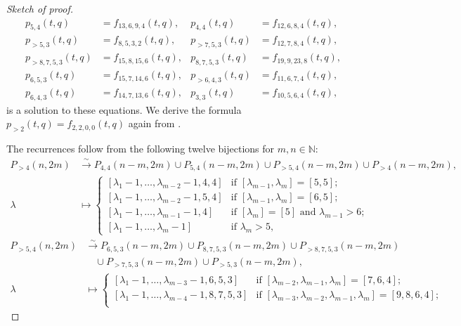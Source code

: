 \documentclass[a4paper, 12pt, reqno]{amsart}
\theoremstyle{remark}
\begin{document}
\begin{proof}[Sketch of proof]
\begin{align*}
    p_{5, 4}(t, q) &= f_{13, 6, 9, 4}(t, q), &p_{4, 4}(t, q) &= f_{12, 6, 8, 4}(t, q), \\
    p_{>5, 3}(t, q) &= f_{8, 5, 3, 2}(t, q), &p_{>7, 5, 3}(t, q) &= f_{12, 7, 8, 4}(t, q), \\
    p_{>8, 7, 5, 3}(t, q) &= f_{15, 8, 15, 6}(t, q), &p_{8, 7, 5, 3}(t, q) &= f_{19, 9, 23, 8}(t, q), \\
    p_{6, 5, 3}(t, q) &= f_{15, 7, 14, 6}(t, q), &p_{>6, 4, 3}(t, q) &= f_{11, 6, 7, 4}(t, q), \\
    p_{6, 4, 3}(t, q) &= f_{14, 7, 13, 6}(t, q), &p_{3, 3}(t, q) &= f_{10, 5, 6, 4}(t, q),
  \end{align*}
  is a solution to these equations.
  We derive the formula $p_{>2}(t, q) = f_{2, 2, 0, 0}(t, q)$ again from .

  The recurrences follow from the following twelve bijections for $m, n \in \mathbb{N}$:
  \begin{align*}
    P_{>4}(n, 2m) &\xrightarrow{\sim} P_{4, 4}(n - m, 2m) \cup P_{5, 4}(n - m, 2m) \cup P_{>5, 4}(n - m, 2m) \cup P_{>4}(n - m, 2m), \\
    \lambda &\mapsto
              \begin{cases}
                [\lambda_1 - 1, \dots, \lambda_{m - 2} - 1, 4, 4] &\text{if $[\lambda_{m - 1}, \lambda_m] = [5, 5]$}; \\
                [\lambda_1 - 1, \dots, \lambda_{m - 2} - 1, 5, 4] &\text{if $[\lambda_{m - 1}, \lambda_m] = [6, 5]$}; \\
                [\lambda_1 - 1, \dots, \lambda_{m - 1} - 1, 4] &\text{if $[\lambda_m] = [5]$ and $\lambda_{m - 1} > 6$}; \\
                [\lambda_1 - 1, \dots, \lambda_m - 1] &\text{if $\lambda_m > 5$},
              \end{cases}
  \end{align*}
  \begin{align*}
    P_{>5, 4}(n, 2m) &\xrightarrow{\sim} P_{6, 5, 3}(n - m, 2m) \cup P_{8, 7, 5, 3}(n - m, 2m) \cup P_{>8, 7, 5, 3}(n - m, 2m) \\
                     &\quad \cup P_{>7, 5, 3}(n - m, 2m) \cup P_{>5, 3}(n - m, 2m), \\
    \lambda &\mapsto
              \begin{cases}
                [\lambda_1 - 1, \dots, \lambda_{m - 3} - 1, 6, 5, 3] &\text{if $[\lambda_{m - 2}, \lambda_{m - 1}, \lambda_m] = [7, 6, 4]$}; \\
                [\lambda_1 - 1, \dots, \lambda_{m - 4} - 1, 8, 7, 5, 3] &\text{if $[\lambda_{m - 3}, \lambda_{m - 2}, \lambda_{m - 1}, \lambda_m] = [9, 8, 6, 4]$}; \\

\end{cases}
\end{align*}
\end{proof}
\end{document}
